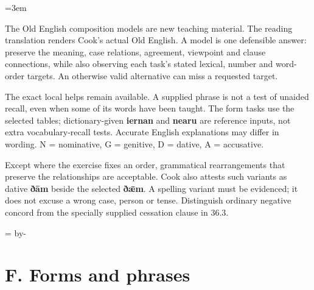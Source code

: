\newcommand{\runningtitle}{Unit 16. Answer key}

\emergencystretch=3em
\newcommand{\itempara}[2]{\par\addvspace{3pt}\noindent\hangindent=1.8em\hangafter=1\makebox[1.8em][l]{#1.}#2\par}
\newcommand{\reserve}[1]{\par\penalty-100\begingroup\dimen0=\pagegoal\advance\dimen0 by-\pagetotal\ifdim\dimen0<#1\newpage\fi\endgroup}

\raggedright
{}

The Old English composition models are new teaching material. The reading translation renders Cook’s actual Old English. A model is one defensible answer: preserve the meaning, case relations, agreement, viewpoint and clause connections, while also observing each task’s stated lexical, number and word-order targets. An otherwise valid alternative can miss a requested target.

The exact local helps remain available. A supplied phrase is not a test of unaided recall, even when some of its words have been taught. The form tasks use the selected tables; dictionary-given \textbf{iernan} and \textbf{nearu} are reference inputs, not extra vocabulary-recall tests. Accurate English explanations may differ in wording. N = nominative, G = genitive, D = dative, A = accusative.

Except where the exercise fixes an order, grammatical rearrangements that preserve the relationships are acceptable. Cook also attests such variants as dative \textbf{ðām} beside the selected \textbf{ðǣm}. A spelling variant must be evidenced; it does not excuse a wrong case, person or tense. Distinguish ordinary negative concord from the specially supplied cessation clause in 36.3.

\reserve{7\baselineskip}
\section*{F. Forms and phrases}

